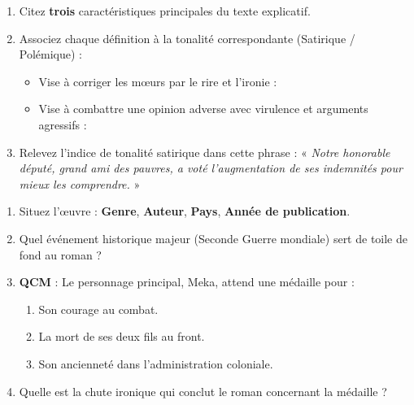 \documentclass[11pt]{article}
\begin{document}
\begin{exercice}
\begin{enumerate}
    \item Citez \textbf{trois} caractéristiques principales du texte explicatif.
    \item Associez chaque définition à la tonalité correspondante (Satirique / Polémique) :
    \begin{itemize}
        \item[--] Vise à corriger les mœurs par le rire et l'ironie : \underline{\hspace{5cm}}
        \item[--] Vise à combattre une opinion adverse avec virulence et arguments agressifs : \underline{\hspace{5cm}}
    \end{itemize}
    \item Relevez l'indice de tonalité satirique dans cette phrase : « \textit{Notre honorable député, grand ami des pauvres, a voté l'augmentation de ses indemnités pour mieux les comprendre.} »
\end{enumerate}
\end{exercice}

\begin{exercice}
\begin{enumerate}
    \item Situez l'œuvre : \textbf{Genre}, \textbf{Auteur}, \textbf{Pays}, \textbf{Année de publication}.
    \item Quel événement historique majeur (Seconde Guerre mondiale) sert de toile de fond au roman ?
    \item \textbf{QCM} : Le personnage principal, Meka, attend une médaille pour :
    \begin{enumerate}
        \item Son courage au combat.
        \item La mort de ses deux fils au front.
        \item Son ancienneté dans l'administration coloniale.
    \end{enumerate}
    \item Quelle est la chute ironique qui conclut le roman concernant la médaille ?
\end{enumerate}
\end{exercice}
\end{document}
